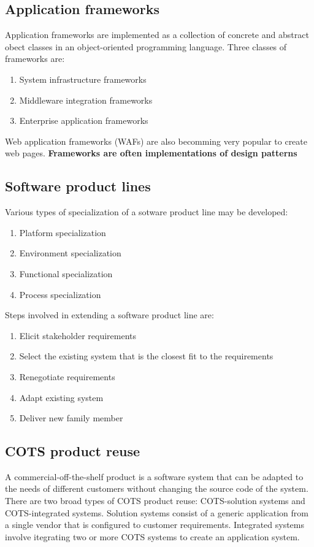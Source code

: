 \documentclass{article}
\begin{document}
\subsection{Application frameworks}
Application frameworks are implemented as a collection of concrete and abstract obect classes in an object-oriented programming language.
Three classes of frameworks are:
\begin{enumerate}
\item System infrastructure frameworks
\item Middleware integration frameworks
\item Enterprise application frameworks
\end{enumerate}
Web application frameworks (WAFs) are also becomming very popular to create web pages.
\textbf{Frameworks are often implementations of design patterns}

\subsection{Software product lines}
Various types of specialization of a sotware product line may be developed:
\begin{enumerate}
\item Platform specialization
\item Environment specialization
\item Functional specialization
\item Process specialization
\end{enumerate}
Steps involved in extending a software product line are:
\begin{enumerate}
\item Elicit stakeholder requirements
\item Select the existing system that is the closest fit to the requirements
\item Renegotiate requirements
\item Adapt existing system
\item Deliver new family member
\end{enumerate}
\subsection{COTS product reuse}
A commercial-off-the-shelf product is a software system that can be adapted to the needs of different customers without changing the source code of the system.
There are two broad types of COTS product reuse: COTS-solution systems and COTS-integrated systems.
Solution systems consist of a generic application from a single vendor that is configured to customer requirements.
Integrated systems involve itegrating two or more COTS systems to create an application system.
\end{document}
